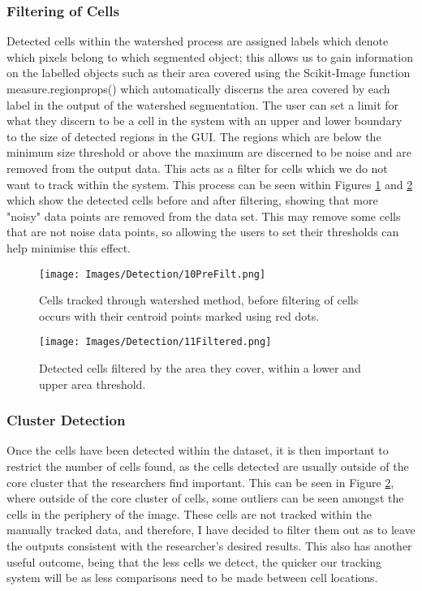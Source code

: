 \documentclass[12pt a4paper]{article}
\begin{document}
\subsubsection{Filtering of Cells}
Detected cells within the watershed process are assigned labels which denote which pixels belong to which segmented object; this allows us to gain information on the labelled objects such as their area covered using the Scikit-Image function measure.regionprops() which automatically discerns the area covered by each label in the output of the watershed segmentation. The user can set a limit for what they discern to be a cell in the system with an upper and lower boundary to the size of detected regions in the GUI. The regions which are below the minimum size threshold or above the maximum are discerned to be noise and are removed from the output data. This acts as a filter for cells which we do not want to track within the system. This process can be seen within Figures \ref{fig:prefilt} and \ref{fig:filtSize} which show the detected cells before and after filtering, showing that more "noisy" data points are removed from the data set. This may remove some cells that are not noise data points, so allowing the users to set their thresholds can help minimise this effect.
\begin{figure}
    \centering
    \texttt{[image: Images/Detection/10PreFilt.png]}
    \caption{Cells tracked through watershed method, before filtering of cells occurs with their centroid points marked using red dots.}
    \label{fig:prefilt}
\end{figure}

\begin{figure}
    \centering
    \texttt{[image: Images/Detection/11Filtered.png]}
    \caption{Detected cells filtered by the area they cover, within a lower and upper area threshold.}
    \label{fig:filtSize}
\end{figure}




\subsubsection{Cluster Detection}
Once the cells have been detected within the dataset, it is then important to restrict the number of cells found, as the cells detected are usually outside of the core cluster that the researchers find important. This can be seen in Figure \ref{fig:filtSize}, where outside of the core cluster of cells, some outliers can be seen  amongst the cells in the periphery of the image. These cells are not tracked within the manually tracked data, and therefore, I have decided to filter them out as to leave the outputs consistent with the researcher's desired results. This also has another useful outcome, being that the less cells we detect, the quicker our tracking system will be as less comparisons need to be made between cell locations.
\end{document}
